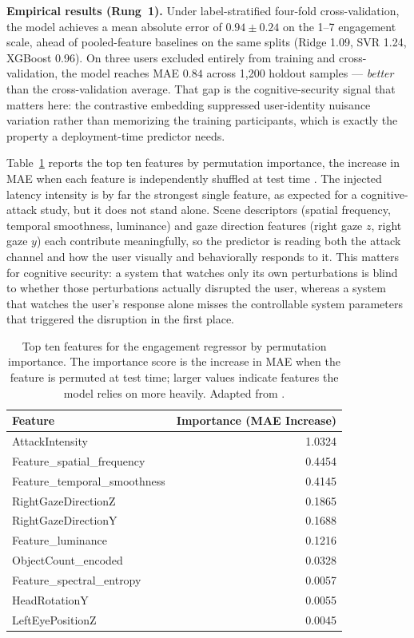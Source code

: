 \documentclass[graybox]{svmult}
\begin{document}
\textbf{Empirical results (Rung~1).}
Under label-stratified four-fold cross-validation, the model achieves a mean absolute error of $0.94 \pm 0.24$ on the 1--7 engagement scale, ahead of pooled-feature baselines on the same splits (Ridge 1.09, SVR 1.24, XGBoost 0.96). On three users excluded entirely from training and cross-validation, the model reaches MAE $0.84$ across 1{,}200 holdout samples --- \emph{better} than the cross-validation average. That gap is the cognitive-security signal that matters here: the contrastive embedding suppressed user-identity nuisance variation rather than memorizing the training participants, which is exactly the property a deployment-time predictor needs.

Table~\ref{tab:engagement-importance} reports the top ten features by permutation importance, the increase in MAE when each feature is independently shuffled at test time \citep{engagement2026mr}. The injected latency intensity is by far the strongest single feature, as expected for a cognitive-attack study, but it does not stand alone. Scene descriptors (spatial frequency, temporal smoothness, luminance) and gaze direction features (right gaze $z$, right gaze $y$) each contribute meaningfully, so the predictor is reading both the attack channel and how the user visually and behaviorally responds to it. This matters for cognitive security: a system that watches only its own perturbations is blind to whether those perturbations actually disrupted the user, whereas a system that watches the user's response alone misses the controllable system parameters that triggered the disruption in the first place.

\begin{table}[t]
\centering
\caption{Top ten features for the engagement regressor by permutation importance. The importance score is the increase in MAE when the feature is permuted at test time; larger values indicate features the model relies on more heavily. Adapted from \citet{engagement2026mr}.}
\label{tab:engagement-importance}
\footnotesize
\setlength{\tabcolsep}{8pt}
\begin{tabular}{lr}
\hline
\textbf{Feature} & \textbf{Importance (MAE Increase)}\\
\hline
AttackIntensity              & 1.0324\\
Feature\_spatial\_frequency    & 0.4454\\
Feature\_temporal\_smoothness  & 0.4145\\
RightGazeDirectionZ          & 0.1865\\
RightGazeDirectionY          & 0.1688\\
Feature\_luminance            & 0.1216\\
ObjectCount\_encoded          & 0.0328\\
Feature\_spectral\_entropy     & 0.0057\\
HeadRotationY                & 0.0055\\
LeftEyePositionZ             & 0.0045\\
\hline
\end{tabular}
\end{table}
\end{document}
